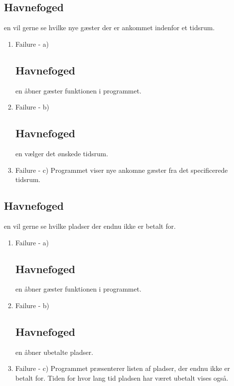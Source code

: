 {{{{	\item{\bf{\subsection{Havnefoged}en vil gerne se hvilke nye gæster der er ankommet indenfor et tidsrum.}}
	  \begin{enumerate}
			\item Failure -  a) \subsection{Havnefoged}en åbner gæster funktionen i programmet.
			\item Failure -  b) \subsection{Havnefoged}en vælger det ønskede tidsrum.
			\item Failure -  c) Programmet viser nye ankomne gæster fra det specificerede tidsrum.
	   \end{enumerate}
  
	\item{\bf{\subsection{Havnefoged}en vil gerne se hvilke pladser der endnu ikke er betalt for.}}
	  \begin{enumerate}
			\item Failure -  a) \subsection{Havnefoged}en åbner gæster funktionen i programmet.
			\item Failure -  b) \subsection{Havnefoged}en åbner ubetalte pladser.
			\item Failure -  c) Programmet præsenterer listen af pladser, der endnu ikke er betalt for. Tiden for hvor lang tid pladsen har været ubetalt vises også.
	   \end{enumerate}
	   
}}}}
